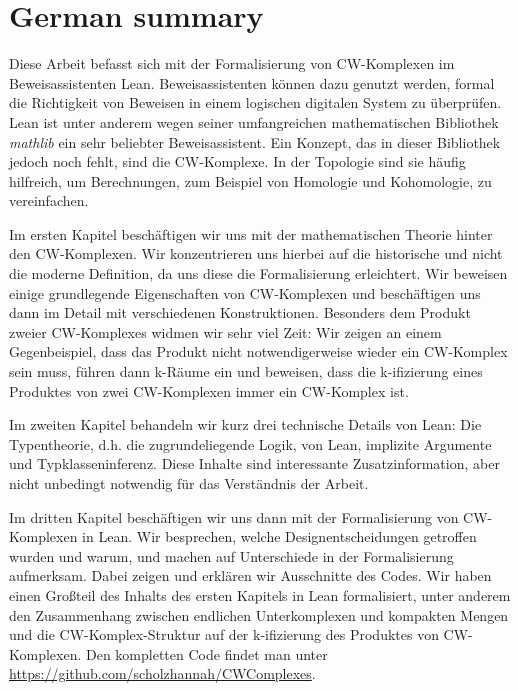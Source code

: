 \chapter*{German summary}

Diese Arbeit befasst sich mit der Formalisierung von CW-Komplexen im Beweisassistenten Lean. 
Beweisassistenten können dazu genutzt werden, formal die Richtigkeit von Beweisen in einem logischen digitalen System zu überprüfen. 
Lean ist unter anderem wegen seiner umfangreichen mathematischen Bibliothek \emph{mathlib} ein sehr beliebter Beweisassistent. 
Ein Konzept, das in dieser Bibliothek jedoch noch fehlt, sind die CW-Komplexe. 
In der Topologie sind sie häufig hilfreich, um Berechnungen, zum Beispiel von Homologie und Kohomologie, zu vereinfachen. 

Im ersten Kapitel beschäftigen wir uns mit der mathematischen Theorie hinter den CW-Komplexen. 
Wir konzentrieren uns hierbei auf die historische und nicht die moderne Definition, da uns diese die Formalisierung erleichtert. 
Wir beweisen einige grundlegende Eigenschaften von CW-Komplexen und beschäftigen uns dann im Detail mit verschiedenen Konstruktionen. 
Besonders dem Produkt zweier CW-Komplexes widmen wir sehr viel Zeit: Wir zeigen an einem Gegenbeispiel, dass das Produkt nicht notwendigerweise wieder ein CW-Komplex sein muss, führen dann k-Räume ein und beweisen, dass die k-ifizierung eines Produktes von zwei CW-Komplexen immer ein CW-Komplex ist.

Im zweiten Kapitel behandeln wir kurz drei technische Details von Lean: Die Typentheorie, d.h. die zugrundeliegende Logik, von Lean, implizite Argumente und Typklasseninferenz.
Diese Inhalte sind interessante Zusatzinformation, aber nicht unbedingt notwendig für das Verständnis der Arbeit. 

Im dritten Kapitel beschäftigen wir uns dann mit der Formalisierung von CW-Komplexen in Lean. 
Wir besprechen, welche Designentscheidungen getroffen wurden und warum, und machen auf Unterschiede in der Formalisierung aufmerksam. 
Dabei zeigen und erklären wir Ausschnitte des Codes. 
Wir haben einen Großteil des Inhalts des ersten Kapitels in Lean formalisiert, unter anderem den Zusammenhang zwischen endlichen Unterkomplexen und kompakten Mengen und die CW-Komplex-Struktur auf der k-ifizierung des Produktes von CW-Komplexen.
Den kompletten Code findet man unter \url{https://github.com/scholzhannah/CWComplexes}.